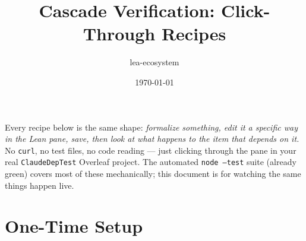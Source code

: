 \documentclass[11pt]{article}
\title{Cascade Verification: Click-Through Recipes}
\author{lea-ecosystem}
\date{\today}
\newcommand{\code}[1]{\texttt{#1}}
\begin{document}
\maketitle

\noindent Every recipe below is the same shape: \emph{formalize something,
edit it a specific way in the Lean pane, save, then look at what happens to
the item that depends on it.} No \code{curl}, no test files, no code
reading --- just clicking through the pane in your real
\code{ClaudeDepTest} Overleaf project. The automated \code{node --test} suite
(already green) covers most of these mechanically; this document is for
watching the same things happen live.

\section{One-Time Setup}
\end{document}
